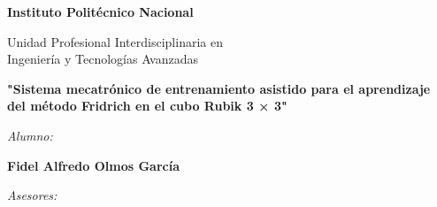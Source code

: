 \begin{titlepage}
         \begin{center}
            
              \vfill
              
            \begin{center}
                    {\Large \bf Instituto Politécnico Nacional }
                    
                    \vfill
                    
                    Unidad Profesional Interdisciplinaria en \\
                    Ingeniería y Tecnologías Avanzadas
                    
                    \vfill
            \end{center}
            
              \vfill
        
        
              \textbf{\Large "Sistema mecatrónico de entrenamiento asistido para el aprendizaje del método Fridrich en el cubo Rubik 3 × 3"}\\[10pt]
            
              \vfill
            
              {\em  Alumno:} 
            
              \vfill
            
              {\large \bf Fidel Alfredo Olmos García} \\[10pt] 
                
              \vfill
          
          {\em  Asesores:} 


\end{center}
\end{titlepage}
